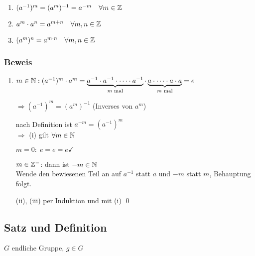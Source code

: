 {\renewcommand{\labelenumi}{(\roman{enumi})}
\begin{enumerate}
	\item
	$(a^{-1})^m = (a^m)^{-1} = a^{-m} \quad \forall m \in \mathbb{Z}$
	
	\item
	$a^m \cdot a^n = a^{m+n} \quad \forall m, n \in \mathbb{Z}$
	
	\item
	$(a^m)^n=a^{m \cdot n} \quad \forall m, n \in \mathbb{Z}$
\end{enumerate}

\subsubsection*{Beweis}
\begin{enumerate}
	\item
	$m \in \mathbb{N}: (a^{-1})^m \cdot a^m = \underbrace{a^{-1} \cdot a^{-1}\cdot \dots \cdot a^{-1}}_{m \text{ mal}} \cdot \underbrace{a \cdot \dots \cdot a \cdot a}_{m \text{ mal}} = e$
	
	$\Rightarrow (a^{-1})^m = (a^m)^{-1}$ (Inverses von $a^m$)
	
	nach Definition ist $a^{-m} = (a^{-1})^m$
	\\ $\Rightarrow $ (i) gilt $\forall m \in \mathbb{N}$
	
	$m = 0: \; e = e = e \checkmark$
	
	$m \in \mathbb{Z}^-$: dann ist $-m \in \mathbb{N}$
	\\ Wende den bewiesenen Teil an auf $a^{-1}$ statt $a$ und $-m$ statt $m$, Behauptung folgt.
	
	\item[(ii), (iii)]
	per Induktion und mit (i) \qed
\end{enumerate}}

\subsection[Satz und Definition: Ordnung, zyklische Gruppe]{Satz und Definition}

$G$ endliche Gruppe, $g \in G$

